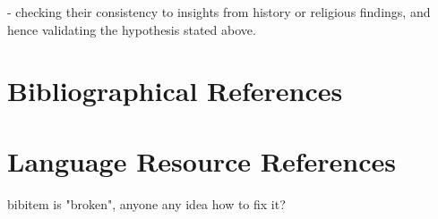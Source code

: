 \documentclass[a4paper,10pt]{article}
\newcommand{\TODO}[1]{\begingroup\color{red}#1\endgroup}
\begin{document}
\TODO{- checking their consistency to insights from history or religious findings, and hence validating the hypothesis stated above.}



\section{Bibliographical References}
\label{main:ref}





\section{Language Resource References}
\label{lr:ref}
\TODO{bibitem is "broken", anyone any idea how to fix it?}
\end{document}
